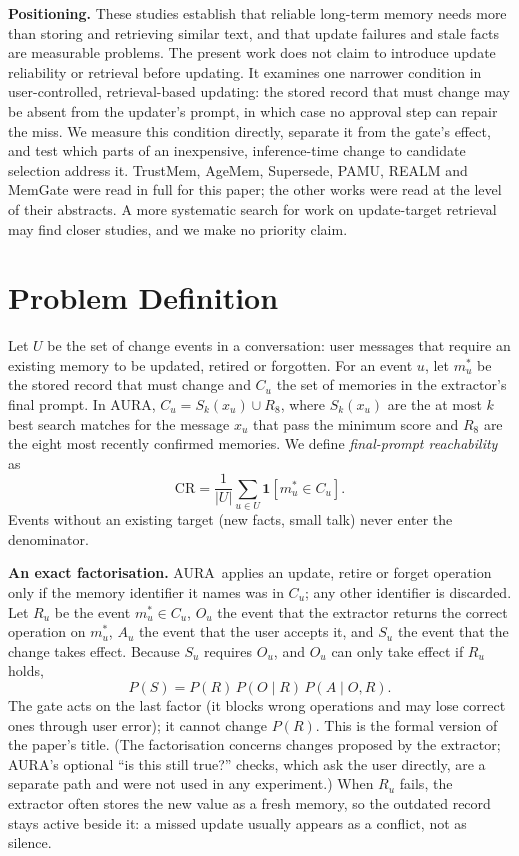 \IfFileExists{IEEEtran.cls}{\documentclass[journal]{IEEEtran}\def\HAVEIEEE{1}}{\documentclass[10pt,twocolumn]{article}\usepackage[margin=0.7in,columnsep=0.25in]{geometry}}
\newcommand{\aura}{AURA}
\begin{document}
\textbf{Positioning.} These studies establish that reliable long-term memory needs more than storing and retrieving similar text, and that update failures and stale facts are measurable problems. The present work does not claim to introduce update reliability or retrieval before updating. It examines one narrower condition in user-controlled, retrieval-based updating: the stored record that must change may be absent from the updater's prompt, in which case no approval step can repair the miss. We measure this condition directly, separate it from the gate's effect, and test which parts of an inexpensive, inference-time change to candidate selection address it. TrustMem, AgeMem, Supersede, PAMU, REALM and MemGate were read in full for this paper; the other works were read at the level of their abstracts. A more systematic search for work on update-target retrieval may find closer studies, and we make no priority claim.

\section{Problem Definition}
\label{sec:problem}
Let $U$ be the set of change events in a conversation: user messages that require an existing memory to be updated, retired or forgotten. For an event $u$, let $m^*_u$ be the stored record that must change and $C_u$ the set of memories in the extractor's final prompt. In \aura, $C_u = S_k(x_u) \cup R_8$, where $S_k(x_u)$ are the at most $k$ best search matches for the message $x_u$ that pass the minimum score and $R_8$ are the eight most recently confirmed memories. We define \emph{final-prompt reachability} as
\begin{equation}
\mathrm{CR} = \frac{1}{|U|}\sum_{u\in U} \mathbf{1}\left[m^*_u \in C_u\right].
\end{equation}
Events without an existing target (new facts, small talk) never enter the denominator.

\textbf{An exact factorisation.} \aura\ applies an update, retire or forget operation only if the memory identifier it names was in $C_u$; any other identifier is discarded. Let $R_u$ be the event $m^*_u\in C_u$, $O_u$ the event that the extractor returns the correct operation on $m^*_u$, $A_u$ the event that the user accepts it, and $S_u$ the event that the change takes effect. Because $S_u$ requires $O_u$, and $O_u$ can only take effect if $R_u$ holds,
\begin{equation}
P(S) = P(R)\,P(O \mid R)\,P(A \mid O, R).
\end{equation}
The gate acts on the last factor (it blocks wrong operations and may lose correct ones through user error); it cannot change $P(R)$. This is the formal version of the paper's title. (The factorisation concerns changes proposed by the extractor; \aura's optional ``is this still true?'' checks, which ask the user directly, are a separate path and were not used in any experiment.) When $R_u$ fails, the extractor often stores the new value as a fresh memory, so the outdated record stays active beside it: a missed update usually appears as a conflict, not as silence.
\end{document}
